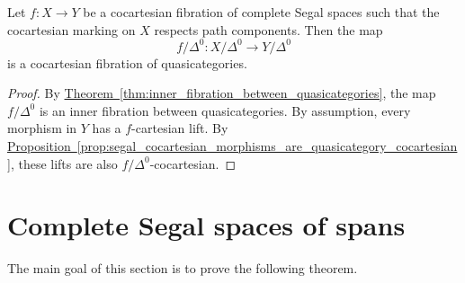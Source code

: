 \documentclass[main.tex]{subfiles}
\begin{document}
\begin{corollary}
  \label{cor:cocart_fib_between_css_gives_cocart_fib_of_quasicats}
  Let $f\colon X \to Y$ be a cocartesian fibration of complete Segal spaces such that the cocartesian marking on $X$ respects path components. Then the map
  \begin{equation*}
    f/\Delta^{0}\colon X/\Delta^{0} \to Y/\Delta^{0}
  \end{equation*}
  is a cocartesian fibration of quasicategories.
\end{corollary}
\begin{proof}
  By \hyperref[thm:inner_fibration_between_quasicategories]{Theorem~\ref*{thm:inner_fibration_between_quasicategories}}, the map $f/\Delta^{0}$ is an inner fibration between quasicategories. By assumption, every morphism in $Y$ has a $f$-cartesian lift. By \hyperref[prop:segal_cocartesian_morphisms_are_quasicategory_cocartesian]{Proposition~\ref*{prop:segal_cocartesian_morphisms_are_quasicategory_cocartesian}}, these lifts are also $f / \Delta^{0}$-cocartesian.
\end{proof}

\section{Complete Segal spaces of spans}
\label{sec:complete_segal_spaces_of_spans}

The main goal of this section is to prove the following theorem.
\end{document}

